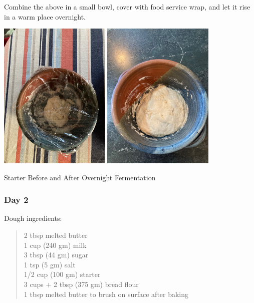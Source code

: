 \documentclass[
]{book}
\begin{document}
Combine the above in a small bowl, cover with food service wrap, and let it rise in a warm place overnight.

\includegraphics[width=0.4\textwidth,height=\textheight]{images/rollstarter1.jpeg}
\includegraphics[width=0.4\textwidth,height=\textheight]{images/rollstarter2.jpeg}

Starter Before and After Overnight Fermentation

\hypertarget{day-2}{%
\subsubsection{Day 2}\label{day-2}}

Dough ingredients:

\begin{quote}
2 tbsp melted butter\\
1 cup (240 gm) milk\\
3 tbsp (44 gm) sugar\\
1 tsp (5 gm) salt\\
1/2 cup (100 gm) starter\\
3 cups + 2 tbsp (375 gm) bread flour\\
1 tbsp melted butter to brush on surface after baking
\end{quote}
\end{document}
